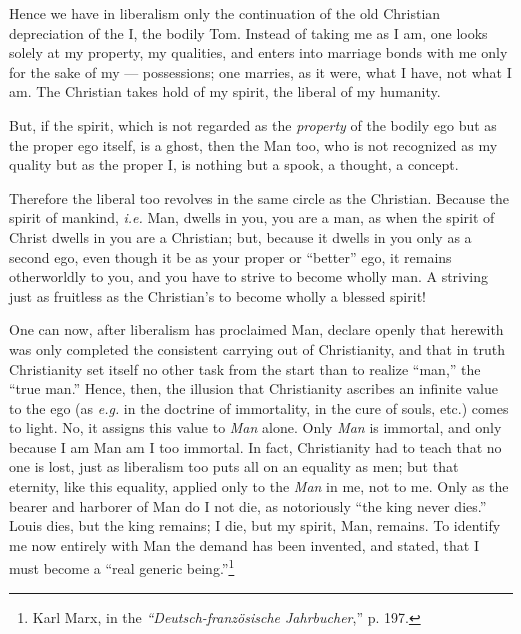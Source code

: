 Hence we have in liberalism only the continuation of the old Christian 
depreciation of the I, the bodily Tom. Instead of taking me as I am, one looks 
solely at my property, my qualities, and enters into marriage bonds with me 
only for the sake of my --- possessions; one marries, as it were, what I have, 
not what I am. The Christian takes hold of my spirit, the liberal of my 
humanity.

But, if the spirit, which is not regarded as the \textit{property} of the 
bodily ego but as the proper ego itself, is a ghost, then the Man too, who is 
not recognized as my quality but as the proper I, is nothing but a spook, a 
thought, a concept.

Therefore the liberal too revolves in the same circle as the Christian. 
Because the spirit of mankind, \textit{i.e.} Man, dwells in you, you are a 
man, as when the spirit of Christ dwells in you are a Christian; but, because 
it dwells in you only as a second ego, even though it be as your proper or 
``better'' ego, it remains otherworldly to you, and you have to strive to 
become wholly man. A striving just as fruitless as the Christian's to become 
wholly a blessed spirit!

One can now, after liberalism has proclaimed Man, declare openly that herewith 
was only completed the consistent carrying out of Christianity, and that in 
truth Christianity set itself no other task from the start than to realize 
``man,'' the ``true man.'' Hence, then, the illusion that Christianity 
ascribes an infinite value to the ego (as \textit{e.g.} in the doctrine of 
immortality, in the cure of souls, etc.) comes to light. No, it assigns this 
value to \textit{Man} alone. Only \textit{Man} is immortal, and only because I 
am Man am I too immortal. In fact, Christianity had to teach that no one is 
lost, just as liberalism too puts all on an equality as men; but that 
eternity, like this equality, applied only to the \textit{Man} in me, not to 
me. Only as the bearer and harborer of Man do I not die, as notoriously ``the 
king never dies.'' Louis dies, but the king remains; I die, but my spirit, 
Man, remains. To identify me now entirely with Man the demand has been 
invented, and stated, that I must become a ``real generic 
being.''\footnote{Karl Marx, in the \textit{``Deutsch-franz\"osische 
Jahrbucher},'' p. 197.}

